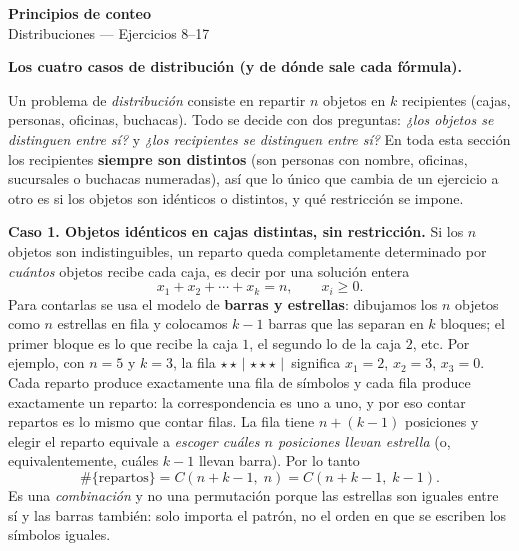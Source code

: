 \documentclass[11pt]{article}
\begin{document}
\begin{center}{\LARGE\bfseries Principios de conteo}\\[2pt]{\large Distribuciones --- Ejercicios 8--17}\end{center}

\begin{teo}
\textbf{Los cuatro casos de distribución (y de dónde sale cada fórmula).}

Un problema de \emph{distribución} consiste en repartir $n$ objetos en $k$ recipientes (cajas, personas, oficinas, buchacas). Todo se decide con dos preguntas: \emph{¿los objetos se distinguen entre sí?} y \emph{¿los recipientes se distinguen entre sí?} En toda esta sección los recipientes \textbf{siempre son distintos} (son personas con nombre, oficinas, sucursales o buchacas numeradas), así que lo único que cambia de un ejercicio a otro es si los objetos son idénticos o distintos, y qué restricción se impone.

\medskip
\textbf{Caso 1. Objetos idénticos en cajas distintas, sin restricción.}
Si los $n$ objetos son indistinguibles, un reparto queda completamente determinado por \emph{cuántos} objetos recibe cada caja, es decir por una solución entera
\[
x_1+x_2+\cdots+x_k=n,\qquad x_i\ge 0 .
\]
Para contarlas se usa el modelo de \textbf{barras y estrellas}: dibujamos los $n$ objetos como $n$ estrellas en fila y colocamos $k-1$ barras que las separan en $k$ bloques; el primer bloque es lo que recibe la caja $1$, el segundo lo de la caja $2$, etc. Por ejemplo, con $n=5$ y $k=3$, la fila $\star\star\,|\,\star\star\star\,|\,$ significa $x_1=2$, $x_2=3$, $x_3=0$. Cada reparto produce exactamente una fila de símbolos y cada fila produce exactamente un reparto: la correspondencia es uno a uno, y por eso contar repartos es lo mismo que contar filas. La fila tiene $n+(k-1)$ posiciones y elegir el reparto equivale a \emph{escoger cuáles $n$ posiciones llevan estrella} (o, equivalentemente, cuáles $k-1$ llevan barra). Por lo tanto
\[
\#\{\text{repartos}\}=C(n+k-1,\;n)=C(n+k-1,\;k-1).
\]
Es una \emph{combinación} y no una permutación porque las estrellas son iguales entre sí y las barras también: solo importa el patrón, no el orden en que se escriben los símbolos iguales.


\end{teo}
\end{document}

